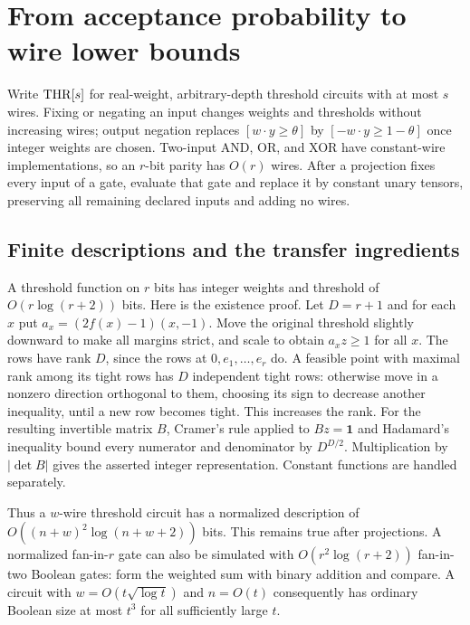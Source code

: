 \section{From acceptance probability to wire lower bounds}
\label{sec:lower}

Write $\mathrm{THR}[s]$ for real-weight, arbitrary-depth threshold circuits
with at most $s$ wires. Fixing or negating an input changes weights
and thresholds without increasing wires; output negation replaces
$[w\cdot y\ge\theta]$ by $[-w\cdot y\ge1-\theta]$ once integer weights
are chosen. Two-input AND, OR, and XOR have constant-wire implementations,
so an $r$-bit parity has $O(r)$ wires.
After a projection fixes every input of a gate, evaluate that gate and
replace it by constant unary tensors, preserving all remaining declared
inputs and adding no wires.

\subsection{Finite descriptions and the transfer ingredients}

A threshold function on $r$ bits has integer weights and threshold of
$O(r\log(r+2))$ bits. Here is the existence proof. Let $D=r+1$ and
for each $x$ put $a_x=(2f(x)-1)(x,-1)$. Move the original threshold
slightly downward to make all margins strict, and scale to obtain
$a_xz\ge1$ for all $x$. The rows have rank $D$, since the rows at
$0,e_1,\ldots,e_r$ do. A feasible point with maximal rank among its
tight rows has $D$ independent tight rows: otherwise move in a
nonzero direction orthogonal to them, choosing its sign to decrease
another inequality, until a new row becomes tight. This
increases the rank. For the resulting invertible matrix $B$, Cramer's
rule applied to $Bz=\mathbf1$ and Hadamard's inequality bound every
numerator and denominator by $D^{D/2}$. Multiplication by
$|\det B|$ gives the asserted integer representation. Constant
functions are handled separately.

Thus a $w$-wire threshold circuit has a normalized description of
$O((n+w)^2\log(n+w+2))$ bits. This remains true after projections.
A normalized fan-in-$r$ gate can also be simulated with
$O(r^2\log(r+2))$ fan-in-two Boolean gates: form the weighted sum
with binary addition and compare. A circuit with
$w=O(t\sqrt{\log t})$ and $n=O(t)$ consequently has ordinary
Boolean size at most $t^3$ for all sufficiently large $t$.


